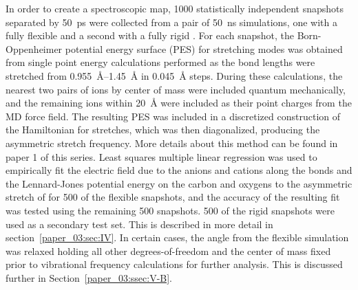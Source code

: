 \documentclass[%
  class = book,%
  crop = false,%
  float = true,%
  multi = true,%
  preview = false,%
]{standalone}
\begin{document}
In order to create a spectroscopic map, \num{1000} statistically independent snapshots separated by \SI{50}{\pico\second} were collected from a pair of \SI{50}{\nano\second} simulations, one with a fully flexible  and a second with a fully rigid . For each snapshot, the Born-Oppenheimer potential energy surface (PES) for  stretching modes was obtained from single point energy calculations performed as the  bond lengths were stretched from \SIrange{0.955}{1.45}{\angstrom} in \SI{0.045}{\angstrom} steps. During these calculations, the nearest two pairs of ions by center of mass were included quantum mechanically, and the remaining ions within \SI{20}{\angstrom} were included as their point charges from the MD force field. The resulting PES was included in a discretized construction of the Hamiltonian for  stretches, which was then diagonalized, producing the asymmetric stretch frequency. More details about this method can be found in paper 1 of this series. Least squares multiple linear regression was used to empirically fit the electric field due to the anions and cations along the  bonds and the Lennard-Jones potential energy on the  carbon and oxygens to the asymmetric stretch of  for \num{500} of the flexible snapshots, and the accuracy of the resulting fit was tested using the remaining \num{500} snapshots. \num{500} of the rigid snapshots were used as a secondary test set. This is described in more detail in section~\ref{paper_03:sec:IV}. In certain cases, the  angle from the flexible simulation was relaxed holding all other degrees-of-freedom and the  center of mass fixed prior to vibrational frequency calculations for further analysis. This is discussed further in Section~\ref{paper_03:ssec:V-B}.

\section{\texorpdfstring{}{Spectroscopic Map for CO2 Vibrations}}
\label{paper_03:sec:III}
\end{document}
